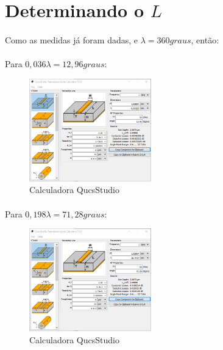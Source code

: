 \documentclass{article}
\begin{document}
\section{Determinando o $L$}

\paragraph{} Como as medidas já foram dadas, e $\lambda = 360 graus$, então:

\paragraph{} Para $0,036\lambda = 12,96 graus$:

\begin{figure}[h!]
	\begin{center}
	\includegraphics[width=200px]{images/calculadora_1.png}
	\end{center}
	\caption{Calculadora QucsStudio}
	\label{fig:imagem1}
\end{figure}

\paragraph{} Para $0,198\lambda = 71,28 graus$:

\begin{figure}[h!]
	\begin{center}
	\includegraphics[width=200px]{images/calculadora_2.png}
	\end{center}
	\caption{Calculadora QucsStudio}
	\label{fig:imagem1}
\end{figure}
\end{document}
